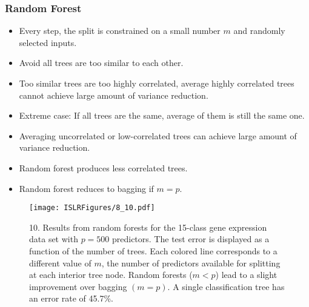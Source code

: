 \documentclass{beamer}
\begin{document}
                      \begin{frame}
                      	\frametitle{Random Forest  }
                      	\begin{itemize}
                      		\item Every step, the split  is constrained on a small number $m$ and randomly 
                      		selected inputs. 
                      		\item  Avoid all trees are too similar to each other. 
                      		\item  Too similar trees are too highly correlated, average highly correlated  trees
                      		cannot achieve large amount of variance reduction.
                      		\item  Extreme case: If all trees are the same, average of them is still the same one.
                      		\item Averaging uncorrelated or low-correlated trees can achieve large amount of variance reduction.
                      		\item Random forest    produces less correlated trees.
                      		\item Random forest reduces to bagging if $m=p$.
                      		
                      		
                      	\end{itemize}
                      \end{frame} 
                   
                     \begin{frame}
                      
                     	\begin{figure}
                     		\centering
                     		
                     		\centering
                     		\texttt{[image: ISLRFigures/8\_10.pdf]}
                     		\caption{\scriptsize 10. Results from random forests for the 15-class gene expression
                     			data set with $p = 500$ predictors. The test error is displayed as a function of
                     			the number of trees. Each colored line corresponds to a different value of $m$, the
                     			number of predictors available for splitting at each interior tree node. Random
                     			forests ($m < p$) lead to a slight improvement over bagging $(m=p)$. A single
                     			classification tree has an error rate of 45.7\%.
                     		}
                     	\end{figure}
                     \end{frame}
                     
\end{document}
